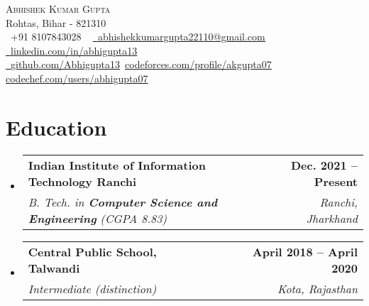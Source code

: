 \documentclass[letterpaper,11pt]{article}
\makeatletter
\newcommand{\resumeSubheading}[4]{
  \vspace{-2pt}\item
    \begin{tabular*}{1.0\textwidth}[t]{l@{\extracolsep{\fill}}r}
      \textbf{#1} & \textbf{\small #2} \\
      \textit{\small#3} & \textit{\small #4} \\
    \end{tabular*}\vspace{-7pt}
}
\newcommand{\resumeSubHeadingListStart}{\begin{itemize}[leftmargin=0.0in, label={}]}
\newcommand{\resumeSubHeadingListEnd}{\end{itemize}}
\makeatother
\begin{document}

    {\vspace{+9pt}\Huge \scshape Abhishek Kumar Gupta} \\ \vspace{+6pt}
    Rohtas, Bihar - 821310 \\ \vspace{+8pt}
    \small \raisebox{-0.1\height}\faPhone\ +91 8107843028 ~ \href{mailto:anubhavshivahre@gmail.com}{\raisebox{-0.2\height}\faEnvelope\  \underline{abhishekkumargupta22110@gmail.com}} ~
    \href{https://www.linkedin.com/in/abhigupta13/}{\raisebox{-0.2\height}\faLinkedin\ \underline{linkedin.com/in/abhigupta13}}~
    \href{https://github.com/Abhigupta13/}{\raisebox{-0.2\height}\faGithub\ \underline{github.com/Abhigupta13}}\   
    \href{https://codeforces.com/profile/akgupta07}{\underline{codeforces.com/profile/akgupta07}}
    \href{https://www.codechef.com/users/abhigupta07} 
        {\underline {codechef.com/users/abhigupta07}}\
    \vspace{+2pt}


\section{Education}
\vspace{+4pt}
  \resumeSubHeadingListStart
    \resumeSubheading
      {Indian Institute of Information Technology Ranchi}{Dec. 2021 -- Present}
      {B. Tech. in \textbf{Computer Science and Engineering} (CGPA 8.83)}{Ranchi, Jharkhand}
    \resumeSubheading{Central Public School, Talwandi}{April 2018 -- April 2020}
    {Intermediate (distinction) }{Kota, Rajasthan}
  \resumeSubHeadingListEnd
\end{document}
